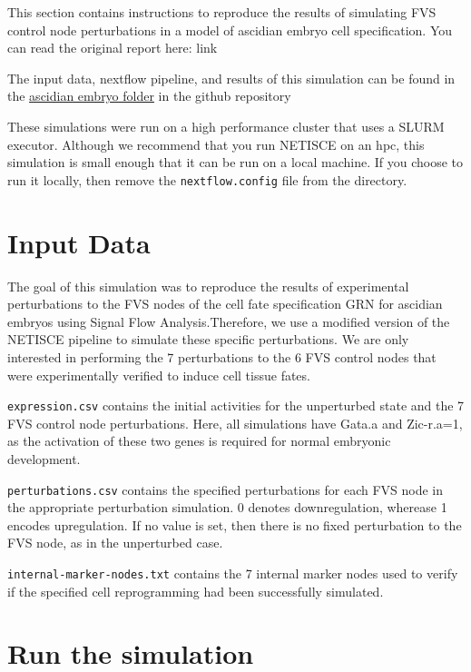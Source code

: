 \documentclass[
]{book}
\begin{document}
This section contains instructions to reproduce the results of simulating FVS control node perturbations in a model of ascidian embryo cell specification. You can read the original report here: link

The input data, nextflow pipeline, and results of this simulation can be found in the \href{https://github.com/VeraLiconaResearchGroup/Netisce/tree/main/ascidian_embryo}{ascidian embryo folder} in the github repository

These simulations were run on a high performance cluster that uses a SLURM executor. Although we recommend that you run NETISCE on an hpc, this simulation is small enough that it can be run on a local machine. If you choose to run it locally, then remove the \texttt{nextflow.config} file from the directory.

\hypertarget{input-data}{%
\section{Input Data}\label{input-data}}

The goal of this simulation was to reproduce the results of experimental perturbations to the FVS nodes of the cell fate specification GRN for ascidian embryos using Signal Flow Analysis.Therefore, we use a modified version of the NETISCE pipeline to simulate these specific perturbations.
We are only interested in performing the 7 perturbations to the 6 FVS control nodes that were experimentally verified to induce cell tissue fates.

\texttt{expression.csv} contains the initial activities for the unperturbed state and the 7 FVS control node perturbations. Here, all simulations have Gata.a and Zic-r.a=1, as the activation of these two genes is required for normal embryonic development.

\texttt{perturbations.csv} contains the specified perturbations for each FVS node in the appropriate perturbation simulation. 0 denotes downregulation, wherease 1 encodes upregulation. If no value is set, then there is no fixed perturbation to the FVS node, as in the unperturbed case.

\texttt{internal-marker-nodes.txt} contains the 7 internal marker nodes used to verify if the specified cell reprogramming had been successfully simulated.

\hypertarget{run-the-simulation}{%
\section{Run the simulation}\label{run-the-simulation}}
\end{document}

